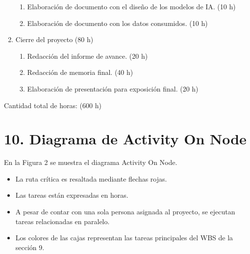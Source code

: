 \documentclass[
11pt, %
]{charter}
\begin{document}
\begin{enumerate}
\begin{enumerate}
			\item Elaboración de documento con el diseño de los modelos de IA. (10 h)
			\item Elaboración de documento con los datos consumidos. (10 h)
		\end{enumerate}
	\item Cierre del proyecto (80 h)
		\begin{enumerate}
			\item Redacción del informe de avance. (20 h)
			\item Redacción de memoria final. (40 h)
			\item Elaboración de presentación para exposición final. (20 h) 
		\end{enumerate}
\end{enumerate}

Cantidad total de horas: (600 h)


\section{10. Diagrama de Activity On Node}
\label{sec:AoN}

En la Figura 2 se muestra el diagrama Activity On Node. 

\begin{itemize}
	\item La ruta crítica es resaltada mediante flechas rojas.
	\item Las tareas están expresadas en horas.
	\item A pesar de contar con una sola persona asignada al proyecto, se ejecutan tareas relacionadas en paralelo.
	\item Los colores de las cajas representan las tareas principales del WBS de la sección 9.
\end{itemize}



\end{document}
